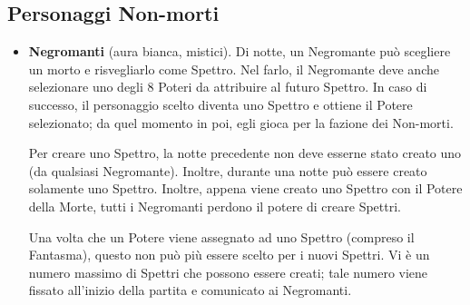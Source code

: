 \documentclass[a4paper,10pt]{article}
\begin{document}
\subsection*{Personaggi Non-morti}

\begin{itemize}
% 
% 
% 
%  
%  
% 

 \item {\bf Negromanti} (aura bianca, mistici). Di notte, un Negromante può scegliere un morto e risvegliarlo come Spettro. Nel farlo, il Negromante deve anche selezionare uno degli 8 Poteri da attribuire al futuro Spettro.
 In caso di successo, il personaggio scelto diventa uno Spettro e ottiene il Potere selezionato; da quel momento in poi, egli gioca per la fazione dei Non-morti.
 
 Per creare uno Spettro, la notte precedente non deve esserne stato creato uno (da qualsiasi Negromante). Inoltre, durante una notte può essere creato solamente uno Spettro. Inoltre, appena viene creato uno Spettro con il Potere della Morte, tutti i Negromanti perdono il potere di creare Spettri.

 Una volta che un Potere viene assegnato ad uno Spettro (compreso il Fantasma), questo non può più essere scelto per i nuovi Spettri.
 Vi è un numero massimo di Spettri che possono essere creati; tale numero viene fissato all'inizio della partita e comunicato ai Negromanti.


\end{itemize}
\end{document}
